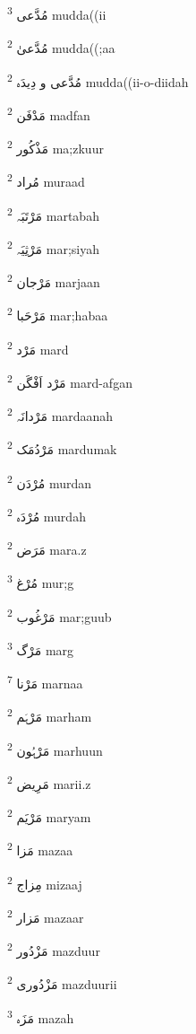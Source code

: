 \documentclass[12pt]{article}
\begin{document}
\begin{multicols}{5}
{\ur مُدَّعی}   \textsuperscript{3} mudda((ii

{\ur مُدَّعیٰ}   \textsuperscript{2} mudda((;aa

{\ur مُدَّعی و دِیدَہ}   \textsuperscript{2} mudda((ii-o-diidah

{\ur مَدْفَن}   \textsuperscript{2} madfan

{\ur مَذْکُور}   \textsuperscript{2} ma;zkuur

{\ur مُراد}   \textsuperscript{2} muraad

{\ur مَرْتَبَہ}   \textsuperscript{2} martabah

{\ur مَرْثِیَہ}   \textsuperscript{2} mar;siyah

{\ur مَرْجان}   \textsuperscript{2} marjaan

{\ur مَرْحَبا}   \textsuperscript{2} mar;habaa

{\ur مَرْد}   \textsuperscript{2} mard

{\ur مَرْد اَفْگَن}   \textsuperscript{2} mard-afgan

{\ur مَرْدانَہ}   \textsuperscript{2} mardaanah

{\ur مَرْدُمَک}   \textsuperscript{2} mardumak

{\ur مُرْدَن}   \textsuperscript{2} murdan

{\ur مُرْدَہ}   \textsuperscript{2} murdah

{\ur مَرَض}   \textsuperscript{2} mara.z

{\ur مُرْغ}   \textsuperscript{3} mur;g

{\ur مَرْغُوب}   \textsuperscript{2} mar;guub

{\ur مَرْگ}   \textsuperscript{3} marg

{\ur مَرْنا}   \textsuperscript{7} marnaa

{\ur مَرْہَم}   \textsuperscript{2} marham

{\ur مَرْہُون}   \textsuperscript{2} marhuun

{\ur مَرِیض}   \textsuperscript{2} marii.z

{\ur مَرْیَم}   \textsuperscript{2} maryam

{\ur مَزا}   \textsuperscript{2} mazaa

{\ur مِزاج}   \textsuperscript{2} mizaaj

{\ur مَزار}   \textsuperscript{2} mazaar

{\ur مَزْدُور}   \textsuperscript{2} mazduur

{\ur مَزْدُوری}   \textsuperscript{2} mazduurii

{\ur مَزَہ}   \textsuperscript{3} mazah


\end{multicols}
\end{document}
